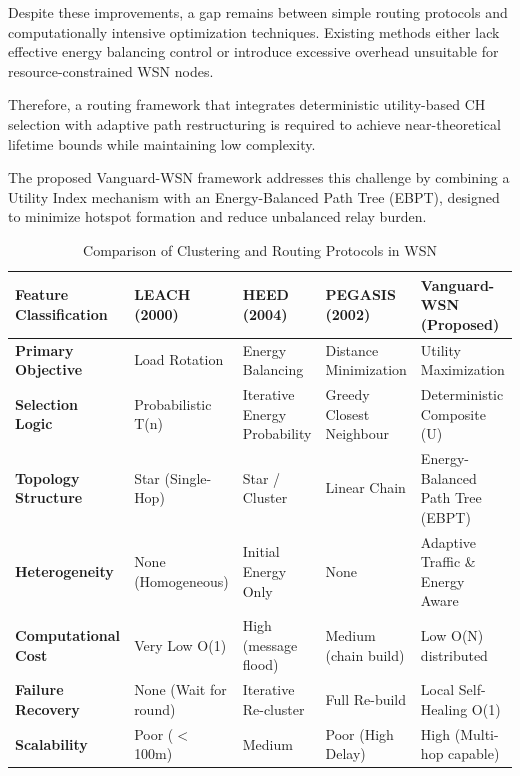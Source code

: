 \documentclass[conference]{IEEEtran}
\begin{document}
Despite these improvements, a gap remains between simple routing protocols and computationally intensive optimization techniques. Existing methods either lack effective energy balancing control or introduce excessive overhead unsuitable for resource-constrained WSN nodes. 

Therefore, a routing framework that integrates deterministic utility-based CH selection with adaptive path restructuring is required to achieve near-theoretical lifetime bounds while maintaining low complexity. 

The proposed Vanguard-WSN framework addresses this challenge by combining a Utility Index mechanism with an Energy-Balanced Path Tree (EBPT), designed to minimize hotspot formation and reduce unbalanced relay burden.

\begin{table}[htbp]
\centering
\renewcommand{\arraystretch}{1.3}
\setlength{\tabcolsep}{6pt}
\caption{Comparison of Clustering and Routing Protocols in WSN}
\label{tab:wsn_comparison}
\begin{tabular}{|p{3cm}|p{2.6cm}|p{2.6cm}|p{2.6cm}|p{3.2cm}|}
\hline
\textbf{Feature Classification} &
\textbf{LEACH (2000)} &
\textbf{HEED (2004)} &
\textbf{PEGASIS (2002)} &
\textbf{Vanguard-WSN (Proposed)} \\
\hline

\textbf{Primary Objective} &
Load Rotation &
Energy Balancing &
Distance Minimization &
Utility Maximization \\
\hline

\textbf{Selection Logic} &
Probabilistic T(n) &
Iterative Energy Probability &
Greedy Closest Neighbour &
Deterministic Composite (U) \\
\hline

\textbf{Topology Structure} &
Star (Single-Hop) &
Star / Cluster &
Linear Chain &
Energy-Balanced Path Tree (EBPT) \\
\hline

\textbf{Heterogeneity} &
None (Homogeneous) &
Initial Energy Only &
None &
Adaptive Traffic \& Energy Aware \\
\hline

\textbf{Computational Cost} &
Very Low O(1) &
High (message flood) &
Medium (chain build) &
Low O(N) distributed \\
\hline

\textbf{Failure Recovery} &
None (Wait for round) &
Iterative Re-cluster &
Full Re-build &
Local Self-Healing O(1) \\
\hline

\textbf{Scalability} &
Poor ($<$100m) &
Medium &
Poor (High Delay) &
High (Multi-hop capable) \\
\hline

\end{tabular}
\end{table}
\end{document}
